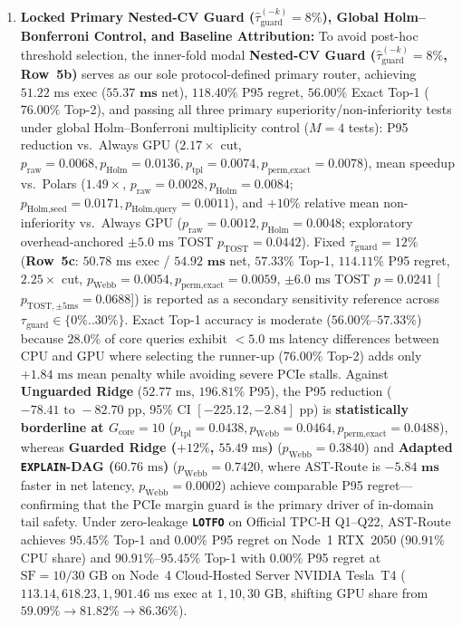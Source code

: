 \documentclass[10pt,a4paper]{article}
\begin{document}
\begin{enumerate}[leftmargin=1.5em,itemsep=1pt]
$216.04\text{ ms}$, $16.50\times$ P95 cut), AST-Route achieves $\mathbf{52.74\text{ ms}}$ exec ($\mathbf{56.89\text{ ms}}$ net) and cuts \texttt{C3} P95 regret by $\mathbf{2.77\times}$ ($338.00\%\rightarrow \mathbf{121.84\%}, p_{\text{Webb}}=0.0042$).
    \item \textbf{Locked Primary Nested-CV Guard ($\hat{\tau}_{\text{guard}}^{(-k)}=8\%$), Global Holm--Bonferroni Control, and Baseline Attribution:} To avoid post-hoc threshold selection, the inner-fold modal \textbf{Nested-CV Guard ($\hat{\tau}_{\text{guard}}^{(-k)}=8\%$, Row~5b)} serves as our sole protocol-defined primary router, achieving $51.22\text{ ms}$ exec ($\mathbf{55.37\text{ ms}}$ net), $\mathbf{118.40\%}$ P95 regret, $\mathbf{56.00\%}$ Exact Top-1 ($\mathbf{76.00\%}$ Top-2), and passing all three primary superiority/non-inferiority tests under global Holm--Bonferroni multiplicity control ($M=4$ tests): P95 reduction vs.\ Always GPU ($2.17\times$ cut, $p_{\text{raw}}=0.0068, p_{\text{Holm}}=0.0136, p_{\text{tpl}}=0.0074, p_{\text{perm,exact}}=0.0078$), mean speedup vs.\ Polars ($1.49\times$, $p_{\text{raw}}=0.0028, p_{\text{Holm}}=0.0084$; $p_{\text{Holm,seed}}=0.0171, p_{\text{Holm,query}}=0.0011$), and $+10\%$ relative mean non-inferiority vs.\ Always GPU ($p_{\text{raw}}=0.0012, p_{\text{Holm}}=0.0048$; exploratory overhead-anchored $\pm 5.0\text{ ms}$ TOST $p_{\text{TOST}}=0.0442$). Fixed $\tau_{\text{guard}}=12\%$ (\textbf{Row~5c}: $50.78\text{ ms}$ exec / $\mathbf{54.92\text{ ms}}$ net, $\mathbf{57.33\%}$ Top-1, $\mathbf{114.11\%}$ P95 regret, $2.25\times$ cut, $p_{\text{Webb}}=0.0054, p_{\text{perm,exact}}=0.0059$, $\pm 6.0\text{ ms}$ TOST $p=0.0241$ [$p_{\text{TOST},\pm 5\text{ms}}=0.0688$]) is reported as a secondary sensitivity reference across $\tau_{\text{guard}}\in\{0\%..30\%\}$. Exact Top-1 accuracy is moderate ($56.00\%\text{--}57.33\%$) because $28.0\%$ of core queries exhibit $<5.0\text{ ms}$ latency differences between CPU and GPU where selecting the runner-up ($76.00\%$ Top-2) adds only $+1.84\text{ ms}$ mean penalty while avoiding severe PCIe stalls. Against \textbf{Unguarded Ridge} ($52.77\text{ ms}$, $196.81\%$ P95), the P95 reduction ($-78.41\text{ to }-82.70\text{ pp}$, 95\% CI $[-225.12,-2.84]\text{ pp}$) is \textbf{statistically borderline at $G_{\text{core}}=10$} ($p_{\text{tpl}}=0.0438, p_{\text{Webb}}=0.0464, p_{\text{perm,exact}}=0.0488$), whereas \textbf{Guarded Ridge ($+12\%$, $55.49\text{ ms}$)} ($p_{\text{Webb}}=0.3840$) and \textbf{Adapted \texttt{EXPLAIN}-DAG ($60.76\text{ ms}$)} ($p_{\text{Webb}}=0.7420$, where AST-Route is $\mathbf{-5.84\text{ ms}}$ faster in net latency, $p_{\text{Webb}}=0.0002$) achieve comparable P95 regret---confirming that the PCIe margin guard is the primary driver of in-domain tail safety. Under zero-leakage \textbf{\texttt{LOTFO}} on Official TPC-H Q1--Q22, AST-Route achieves $\mathbf{95.45\%}$ Top-1 and $\mathbf{0.00\%}$ P95 regret on Node~1 RTX~2050 ($90.91\%$ CPU share) and $\mathbf{90.91\%\text{--}95.45\%}$ Top-1 with $\mathbf{0.00\%}$ P95 regret at $\text{SF}=10/30\text{ GB}$ on Node~4 Cloud-Hosted Server NVIDIA Tesla~T4 ($113.14, 618.23, 1{,}901.46\text{ ms}$ exec at $1, 10, 30\text{ GB}$, shifting GPU share from $\mathbf{59.09\%}\rightarrow\mathbf{81.82\%}\rightarrow\mathbf{86.36\%}$).

\end{enumerate}
\end{document}
